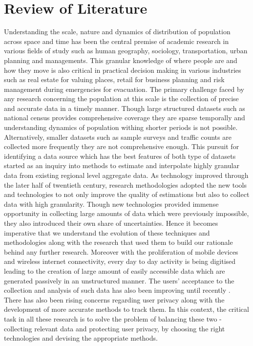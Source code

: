 \chapter{Review of Literature}\label{chapter:literature}

Understanding the scale, nature and dynamics of distribution of population across space and time has been the central premise of academic research in various fields of study such as human geography, sociology, transportation, urban planning and managements.
This granular knowledge of where people are and how they move is also critical in practical decision making in various industries such as real estate for valuing places, retail for business planning and risk management during emergencies for evacuation.
The primary challenge faced by any research concerning the population at this scale is the collection of precise and accurate data in a timely manner.
Though large structured datasets such as national census provides comprehensive coverage they are sparse temporally and understanding dynamics of population withing shorter periods is not possible.
Alternatively, smaller datasets such as sample surveys and traffic counts are collected more frequently they are not comprehensive enough. 
This pursuit for identifying a data source which has the best features of both type of datasets started as an inquiry into methods to estimate and interpolate highly granular data from existing regional level aggregate data.
As technology improved through the later half of twentieth century, research methodologies adopted the new tools and technologies to not only improve the quality of estimations but also to collect data with high granularity.
Though new technologies provided immense opportunity in collecting large amounts of data which were previously impossible, they also introduced their own share of uncertainties.
Hence it becomes imperative that we understand the evolution of these techniques and methodologies along with the research that used them to build our rationale behind any further research.
Moreover with the proliferation of mobile devices and wireless internet connectivity, every day to day activity is being digitised leading to the creation of large amount of easily accessible data which are generated passively in an unstructured manner.
The users' acceptance to the collection and analysis of such data has also been improving until recently \cite{kobsa2014}.
There has also been rising concerns regarding user privacy along with the development of more accurate methods to track them.
In this context, the critical task in all these research is to solve the problem of balancing these two - collecting relevant data and protecting user privacy, by choosing the right technologies and devising the appropriate methods.

